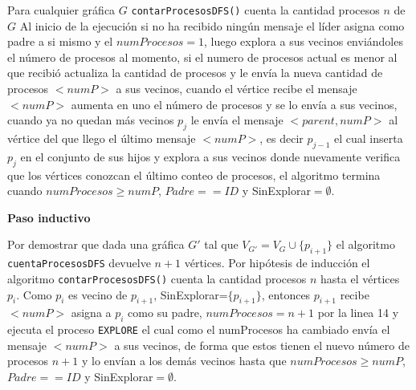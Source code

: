 Para cualquier gráfica $G$ {\tt contarProcesosDFS()} cuenta la cantidad procesos $n$ de $G$
Al inicio de la ejecución si no ha recibido ningún mensaje el líder asigna como padre a si mismo y el $numProcesos = 1$, luego explora a sus vecinos enviándoles el número de procesos al momento, si el numero de procesos actual es menor al que recibió actualiza la cantidad de procesos y le envía la nueva cantidad de procesos $<numP>$ a sus vecinos, cuando el vértice recibe el mensaje $<numP>$ aumenta en uno el número de procesos y se lo envía a sus vecinos, cuando ya no quedan más vecinos $p_j$ le envía el mensaje $<parent,numP>$ al vértice del que llego el último mensaje $<numP>$, es decir $p_{j-1}$ el cual inserta $p_j$ en el conjunto de sus hijos  y explora a sus vecinos donde nuevamente verifica que los vértices conozcan el último conteo de procesos, el algoritmo termina cuando $numProcesos \geqslant  numP$, $Padre == ID$ y SinExplorar$=\emptyset$.

\textbf{Paso inductivo}

Por demostrar que dada una gráfica $G'$ tal que $V_{G'}=V_G \cup \{p_{i+1}\}$ el algoritmo {\tt cuentaProcesosDFS} devuelve $n+1$ vértices.
Por hipótesis de inducción el algoritmo {\tt contarProcesosDFS()} cuenta la cantidad procesos $n$ hasta el vértices $p_i$. Como $p_i$ es vecino de $p_{i+1}$, SinExplorar=$\{p_{i+1}\}$, entonces $p_{i+1}$ recibe $<numP>$ asigna a $p_i$ como su padre, $numProcesos=n+1$ por la linea 14 y ejecuta el proceso {\tt EXPLORE} el cual como el numProcesos ha cambiado envía el mensaje $<numP>$ a sus vecinos, de forma que estos tienen el nuevo número de procesos $n+1$ y lo envían a los demás vecinos hasta que $numProcesos \geqslant  numP$, $Padre == ID$ y SinExplorar$=\emptyset$. 